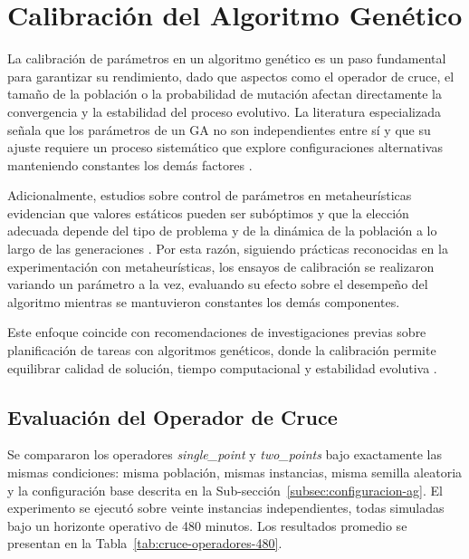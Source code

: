 \section{Calibración del Algoritmo Genético}

La calibración de parámetros en un algoritmo genético es un paso 
fundamental para garantizar su rendimiento, dado que aspectos como 
el operador de cruce, el tamaño de la población o la probabilidad 
de mutación afectan directamente la convergencia y la estabilidad 
del proceso evolutivo. La literatura especializada señala que 
los parámetros de un GA no son independientes entre sí y que su 
ajuste requiere un proceso sistemático que explore configuraciones 
alternativas manteniendo constantes los demás factores \cite{ref3,ref4}.

Adicionalmente, estudios sobre control de parámetros en metaheurísticas 
evidencian que valores estáticos pueden ser subóptimos y que la elección 
adecuada depende del tipo de problema y de la dinámica de la población a lo 
largo de las generaciones \cite{eibenParameterControl}. 
Por esta razón, siguiendo prácticas reconocidas en la experimentación con 
metaheurísticas, los ensayos de calibración se realizaron variando un parámetro 
a la vez, evaluando su efecto sobre el desempeño del algoritmo mientras se 
mantuvieron constantes los demás componentes.

Este enfoque coincide con recomendaciones de investigaciones previas sobre
planificación de tareas con algoritmos genéticos, donde la calibración 
permite equilibrar calidad de solución, tiempo computacional y estabilidad 
evolutiva \cite{Delgado2005,flowshop}.

\subsection{Evaluación del Operador de Cruce}
\label{subsec:cruce}

Se compararon los operadores \textit{single\_point} y \textit{two\_points} bajo exactamente las mismas condiciones: misma población, mismas instancias, misma semilla aleatoria y la configuración base descrita en la Sub-sección~\ref{subsec:configuracion-ag}. El experimento se ejecutó sobre veinte instancias independientes, todas simuladas bajo un horizonte operativo de 480 minutos. Los resultados promedio se presentan en la Tabla~\ref{tab:cruce-operadores-480}.

\begin{table}[htbp]
\centering
\small
\caption{Resultados promedio del AG para cada operador de cruce (horizonte de 480 minutos).}
\label{tab:cruce-operadores-480}
\end{table}

